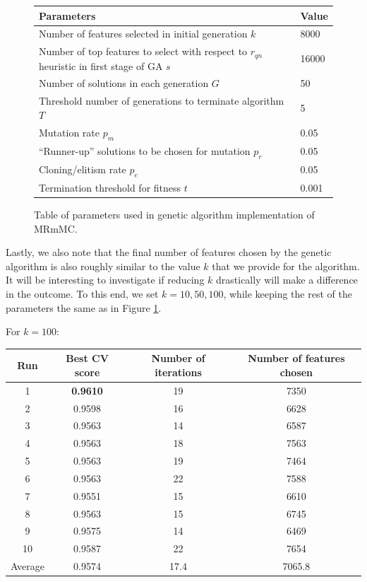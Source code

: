 \documentclass[12pt, twoside, a4paper]{report}
\begin{document}
\begin{figure}
\begin{center}
    \begin{tabular}{| p{12cm} | l |} \hline
    Parameters & Value \\ \hline \hline
    Number of features selected in initial generation $k$ & 8000 \\ \hline
    Number of top features to select with respect to $r_{qn}$ heuristic in first stage of GA $s$ & 16000 \\ \hline
    Number of solutions in each generation $G$ & 50 \\ \hline
    Threshold number of generations to terminate algorithm $T$ & 5 \\ \hline
    Mutation rate $p_m$ &  0.05 \\ \hline
    ``Runner-up'' solutions to be chosen for mutation $p_r$ & 0.05 \\ \hline
    Cloning/elitism rate $p_e$ & 0.05 \\ \hline
    Termination threshold for fitness $t$ & 0.001 \\ \hline
    \end{tabular}
\end{center}
\caption{Table of parameters used in genetic algorithm implementation of MRmMC.}
\label{ga:mrmmc:params_1}
\end{figure}

Lastly, we also note that the final number of features chosen by the genetic algorithm is also roughly similar to the value $k$ that we provide for the algorithm. It will be interesting to investigate if reducing $k$ drastically will make a difference in the outcome. To this end, we set $k=10,50,100$, while keeping the rest of the parameters the same as in Figure \ref{ga:mrmmc:params_1}.

For $k=100$:

\begin{center}
    \begin{tabular}{| c | c | c | c | } \hline
    Run & Best CV score & Number of iterations & Number of features chosen \\ \hline \hline
    1 & \textbf{0.9610} & 19 & 7350 \\ \hline
	2 & 0.9598  & 16 & 6628 \\ \hline
	3 & 0.9563 & 14 & 6587 \\ \hline
	4 & 0.9563 & 18 & 7563 \\ \hline
	5 & 0.9563 & 19 & 7464 \\ \hline
	6 & 0.9563 & 22 & 7588 \\ \hline
	7 & 0.9551 & 15 & 6610 \\ \hline
	8 & 0.9563 & 15 & 6745 \\ \hline
	9 & 0.9575 & 14 & 6469 \\ \hline
	10 & 0.9587 & 22 & 7654 \\ \hline
	Average & 0.9574 & 17.4 & 7065.8 \\ \hline
    \end{tabular}
\end{center}
\end{document}
